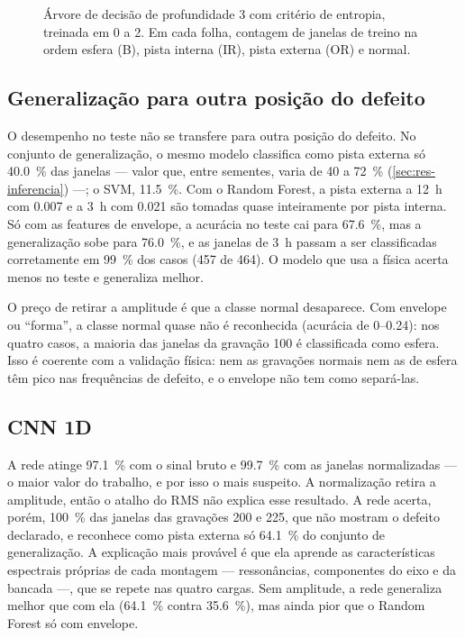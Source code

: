 \begin{figure}[htb]
  \centering
  \caption{Árvore de decisão de profundidade 3 com critério de entropia,
  treinada em 0 a \SI{2}{\hp}. Em cada folha, contagem de janelas de treino na
  ordem esfera (B), pista interna (IR), pista externa (OR) e normal.}
  \label{fig:arvore}
  \begin{minipage}{0.75\textwidth}
    \footnotesize
    
  \end{minipage}
\end{figure}

\subsection{Generalização para outra posição do defeito}
\label{sec:res-generalizacao}

O desempenho no teste não se transfere para outra posição do defeito. No
conjunto de generalização, o mesmo modelo classifica como pista
externa só \SI{40.0}{\percent} das janelas --- valor que, entre sementes, varia de
40 a \SI{72}{\percent} (\autoref{sec:res-inferencia}) ---; o SVM, \SI{11.5}{\percent}. Com o
Random Forest, a pista externa a 12~h com \SI{0.007}{\inch} e a 3~h com
\SI{0.021}{\inch} são tomadas quase inteiramente por pista interna. Só com as
features de envelope, a acurácia no teste cai para \SI{67.6}{\percent}, mas a
generalização sobe para \SI{76.0}{\percent}, e as janelas de 3~h passam a ser
classificadas corretamente em \SI{99}{\percent} dos casos (457 de 464). O modelo
que usa a física acerta menos no teste e generaliza melhor.

O preço de retirar a amplitude é que a classe normal desaparece. Com envelope ou
``forma'', a
classe normal quase não é reconhecida (acurácia de \numrange{0}{0.24}): nos
quatro casos, a maioria das janelas da gravação 100 é classificada como esfera.
Isso é coerente com a validação física: nem as gravações normais nem as de
esfera têm pico nas frequências de defeito, e o envelope não tem como
separá-las.

\subsection{CNN 1D}
\label{sec:res-cnn}

A rede atinge \SI{97.1}{\percent} com o sinal bruto e
\SI{99.7}{\percent} com as janelas normalizadas --- o maior valor do trabalho, e
por isso o mais suspeito. A normalização retira a amplitude, então o atalho do
RMS não explica esse resultado. A rede acerta, porém, \SI{100}{\percent} das
janelas das gravações 200 e 225, que não mostram o defeito declarado, e reconhece
como pista externa só \SI{64.1}{\percent} do conjunto de generalização. A
explicação mais provável é que ela aprende as características espectrais próprias de
cada montagem --- ressonâncias, componentes do eixo e da bancada ---, que se repete
nas quatro cargas. Sem amplitude, a rede generaliza melhor que com ela
(\SI{64.1}{\percent} contra \SI{35.6}{\percent}), mas ainda pior que o Random
Forest só com envelope.

